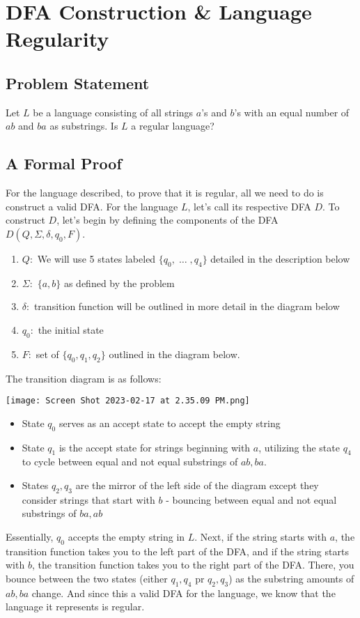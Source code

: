 \section{DFA Construction & Language Regularity}
\subsection{Problem Statement}
Let $L$ be a language consisting of all strings $a$'s and $b$'s with an equal number of $ab$ and $ba$ as substrings. Is $L$ a regular language?
\subsection{A Formal Proof}
For the language described, to prove that it is regular, all we need to do is construct a valid DFA. For the language $L$, let's call its respective DFA $D$. To construct $D$, let's begin by defining the components of the DFA $D(Q,\Sigma,\delta,q_0,F)$.
\begin{enumerate}
    \item $Q:$ We will use 5 states labeled $\{q_0,\;\dots\;,q_4\}$ detailed in the description below
    \item $\Sigma:$ $\{a,b\}$ as defined by the problem
    \item $\delta:$ transition function will be outlined in more detail in the diagram below
    \item $q_0:$ the initial state
    \item $F:$ set of $\{q_0,q_1,q_2\}$ outlined in the diagram below.
\end{enumerate}
The transition diagram is as follows:
\begin{center}
    \texttt{[image: Screen Shot 2023-02-17 at 2.35.09 PM.png]}
\end{center}
\begin{itemize}
    \item State $q_0$ serves as an accept state to accept the empty string
    \item State $q_1$ is the accept state for strings beginning with $a$, utilizing the state $q_4$ to cycle between equal and not equal substrings of $ab,ba$. 
    \item States $q_2,q_3$ are the mirror of the left side of the diagram except they consider strings that start with $b$ - bouncing between equal and not equal substrings of $ba,ab$
\end{itemize}
Essentially, $q_0$ accepts the empty string in $L$. Next, if the string starts with $a$, the transition function takes you to the left part of the DFA, and if the string starts with $b$, the transition function takes you to the right part of the DFA. There, you bounce between the two states (either $q_1,q_4$ pr $q_2,q_3$) as the substring amounts of $ab,ba$ change. And since this a valid DFA for the language, we know that the language it represents is regular.